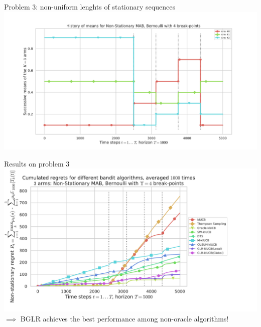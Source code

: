 \documentclass[11pt,english,ignorenonframetext,]{beamer}
\begin{document}
\begin{frame}[plain]{Problem 3: non-uniform lenghts of stationary sequences}
  \centering
  \includegraphics[width=1.15\textwidth]{figures/Problem_4.pdf}
\end{frame}

\begin{frame}[plain]{Results on problem 3}
  \centering
  \includegraphics[width=1.15\textwidth]{figures/regret_problem4.pdf}
  $\implies$ BGLR achieves the best performance among non-oracle algorithms!
\end{frame}
\end{document}
